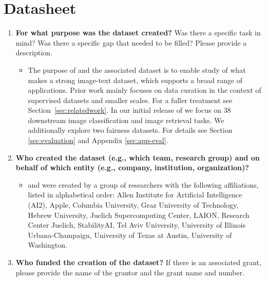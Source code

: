 \section{Datasheet}

\begin{enumerate}[label=Q\arabic*]
\subsection{Motivation}

\item \textbf{For what purpose was the dataset created?} Was there a specific task in mind? Was there a specific gap that needed to be filled? Please provide a description.

\begin{itemize}
\item The purpose of \datanet and the associated \pool dataset is to enable study of what makes a strong image-text dataset, which supports a broad range of applications. Prior work mainly focuses on data curation in the context of supervised datasets and smaller scales. For a fuller treatment see Section~\ref{sec:relatedwork}. In our initial release of \datanet we focus on 38 downstream image classification and image retrieval tasks. We additionally explore two fairness datasets. For details see Section \ref{sec:evaluation} and Appendix \ref{sec:app-eval}.
\end{itemize}

\item \textbf{Who created the dataset (e.g., which team, research group) and on behalf of which entity (e.g., company, institution, organization)?}

\begin{itemize}
\item \datanet and \pool were created by a group of researchers with the following affiliations, listed in alphabetical order: Allen Institute for Artificial Intelligence (AI2), Apple, Columbia University, Graz University of Technology, Hebrew University, Juelich Supercomputing Center, LAION, Research Center Juelich, StabilityAI, Tel Aviv University, University of Illinois Urbana-Champaign, University of Texas at Austin, University of Washington.
\end{itemize}

\item \textbf{Who funded the creation of the dataset?} If there is an associated grant, please provide the name of the grantor and the grant name and number.


\end{enumerate}

